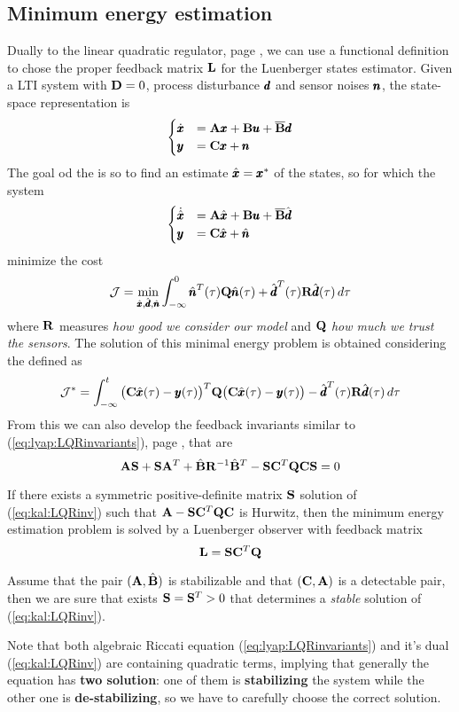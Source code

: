 \subsection{Minimum energy estimation}
	Dually to the linear quadratic regulator, page \pageref{sec:LQR}, we can use a functional definition to chose the proper feedback matrix $\mat L$ for the Luenberger states estimator. Given a LTI system with $\D = 0$, process disturbance $\vet d$ and sensor noises $\vet n$, the state-space representation is
	\[\begin{cases}
		\dx & = \A\x + \B\u + \overline \B\vet d \\ \y& = \C \x + \vet n
	\end{cases}\]
	The goal od the  is so to find an estimate $\hat \x = \x^*$ of the states, so for which the system
	\[\begin{cases}
		\dot{\hat \x} & = \A \hat \x + \B \u + \overline \B \hat{\vet d} \\ \y & = \C \hat \x + \hat{\vet n}
	\end{cases}\]
	minimize the cost
	\[ \mathcal J = \min_{\hat\x, \hat{\vet d}, \hat{\vet n}} \int_{-\infty}^{0} \hat{\vet n}^T(\tau)\Q \hat{\vet n}(\tau) + \hat{ \vet d}^T(\tau) \R \hat{\vet d}(\tau) \, d\tau \]
	where $\R$ measures \textit{how good we consider our model} and $\Q$ \textit{how much we trust the sensors}. The solution of this minimal energy problem is obtained considering the  defined as
	\begin{equation}
		\mathcal J^* = \int_{-\infty}^t \big(\C \hat{\x}(\tau) - \y(\tau) \big)^T\Q \big( \C \hat \x(\tau) - \y(\tau) \big) - \hat{\vet d}^T (\tau) \R \hat{\vet d} (\tau) \, d\tau 
	\end{equation}
	From this we can also develop the feedback invariants similar to (\ref{eq:lyap:LQRinvariants}), page \pageref{eq:lyap:LQRinvariants}, that are
	\begin{equation} \label{eq:kal:LQRinv}
		\A \S + \S\A^T + \hat \B \R^{-1} \hat \B^T - \S\C^T\Q\C \S = 0
	\end{equation}
	\begin{theorem}
		If there exists a symmetric positive-definite matrix $\S$ solution of (\ref{eq:kal:LQRinv}) such that $\A - \S\C^T\Q\C$ is Hurwitz,  then the minimum energy estimation problem is solved by a Luenberger observer with feedback matrix
		\begin{equation}
			\mat L = \S \C^T \Q
		\end{equation}
	\end{theorem}
	\begin{theorem}
		Assume that the pair $(\A,\hat \B)$ is stabilizable and that $(\C,\A)$ is a detectable pair, then we are sure that exists $\S = \S^T > 0$ that determines a \textit{stable} solution of (\ref{eq:kal:LQRinv}).
	\end{theorem}
	Note that both algebraic Riccati equation (\ref{eq:lyap:LQRinvariants}) and it's dual (\ref{eq:kal:LQRinv}) are containing quadratic terms, implying that generally the equation has \textbf{two solution}: one of them is \textbf{stabilizing} the system while the other one is \textbf{de-stabilizing}, so we have to carefully choose the correct solution.
	
